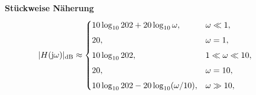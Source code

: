 \vspace{0.5cm}
\medskip
\noindent\textbf{Stückweise Näherung}
\[
|H(\operatorname{j}\!\omega)|_{\mathrm{dB}}\approx
\begin{cases}
10\log_{10}202+20\log_{10}\omega,& \omega\ll1,\\[4pt]
20,& \omega=1,\\[4pt]
10\log_{10}202,& 1\ll\omega\ll10,\\[4pt]
20,& \omega=10,\\[4pt]
10\log_{10}202-20\log_{10}(\omega/10),& \omega\gg10,
\end{cases}
\qquad
\]
\newpage